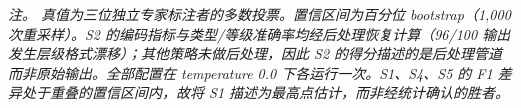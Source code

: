 \documentclass[11pt]{article}
\begin{document}
\textit{\textit{{\cjkfont 注\allowbreak 。}} {\cjkfont 真\allowbreak 值\allowbreak 为\allowbreak 三\allowbreak 位\allowbreak 独\allowbreak 立\allowbreak 专\allowbreak 家\allowbreak 标\allowbreak 注\allowbreak 者\allowbreak 的\allowbreak 多\allowbreak 数\allowbreak 投\allowbreak 票\allowbreak 。\allowbreak 置\allowbreak 信\allowbreak 区\allowbreak 间\allowbreak 为\allowbreak 百\allowbreak 分\allowbreak 位} bootstrap{\cjkfont （}1,000 {\cjkfont 次\allowbreak 重\allowbreak 采\allowbreak 样\allowbreak ）\allowbreak 。}S2 {\cjkfont 的\allowbreak 编\allowbreak 码\allowbreak 指\allowbreak 标\allowbreak 与\allowbreak 类\allowbreak 型}/{\cjkfont 等\allowbreak 级\allowbreak 准\allowbreak 确\allowbreak 率\allowbreak 均\allowbreak 经\allowbreak 后\allowbreak 处\allowbreak 理\allowbreak 恢\allowbreak 复\allowbreak 计\allowbreak 算\allowbreak （}96/100 {\cjkfont 输\allowbreak 出\allowbreak 发\allowbreak 生\allowbreak 层\allowbreak 级\allowbreak 格\allowbreak 式\allowbreak 漂\allowbreak 移\allowbreak ）\allowbreak ；\allowbreak 其\allowbreak 他\allowbreak 策\allowbreak 略\allowbreak 未\allowbreak 做\allowbreak 后\allowbreak 处\allowbreak 理\allowbreak ，\allowbreak 因\allowbreak 此} S2 {\cjkfont 的\allowbreak 得\allowbreak 分\allowbreak 描\allowbreak 述\allowbreak 的\allowbreak 是\allowbreak 后\allowbreak 处\allowbreak 理\allowbreak 管\allowbreak 道\allowbreak 而\allowbreak 非\allowbreak 原\allowbreak 始\allowbreak 输\allowbreak 出\allowbreak 。\allowbreak 全\allowbreak 部\allowbreak 配\allowbreak 置\allowbreak 在} temperature 0.0 {\cjkfont 下\allowbreak 各\allowbreak 运\allowbreak 行\allowbreak 一\allowbreak 次\allowbreak 。}S1{\cjkfont 、}S4{\cjkfont 、}S5 {\cjkfont 的} F1 {\cjkfont 差\allowbreak 异\allowbreak 处\allowbreak 于\allowbreak 重\allowbreak 叠\allowbreak 的\allowbreak 置\allowbreak 信\allowbreak 区\allowbreak 间\allowbreak 内\allowbreak ，\allowbreak 故\allowbreak 将} S1 {\cjkfont 描\allowbreak 述\allowbreak 为\allowbreak 最\allowbreak 高\allowbreak 点\allowbreak 估\allowbreak 计\allowbreak ，\allowbreak 而\allowbreak 非\allowbreak 经\allowbreak 统\allowbreak 计\allowbreak 确\allowbreak 认\allowbreak 的\allowbreak 胜\allowbreak 者\allowbreak 。}}\\
\end{document}

